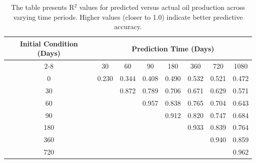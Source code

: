\begin{table}
    \centering
    \caption{R$^2$ of Predicted vs Actual Oil Production at Different Time Periods}
    \label{tab:r2_oil}
    \begin{tabular}{c|ccccccc}
        \toprule
        \multirow{2}{*}{Initial Condition (Days)} & \multicolumn{7}{c}{Prediction Time (Days)} \\
        \cmidrule{2-8}
        & 30 & 60 & 90 & 180 & 360 & 720 & 1080 \\
        \midrule
        0   & 0.230 & 0.344 & 0.408 & 0.490 & 0.532 & 0.521 & 0.472 \\
        30   &  & 0.872 & 0.789 & 0.706 & 0.671 & 0.629 & 0.571 \\
        60   &  &  & 0.957 & 0.838 & 0.765 & 0.704 & 0.643 \\
        90   &  &  &  & 0.912 & 0.820 & 0.747 & 0.684 \\
        180   &  &  &  &  & 0.933 & 0.839 & 0.764 \\
        360   &  &  &  &  &  & 0.940 & 0.859 \\
        720   &  &  &  &  &  &  & 0.962 \\
        \bottomrule
    \end{tabular}
    \vspace{0.2cm}
    \caption*{The table presents R$^2$ values for predicted versus actual oil production across varying time periods. Higher values (closer to 1.0) indicate better predictive accuracy.}
\end{table}